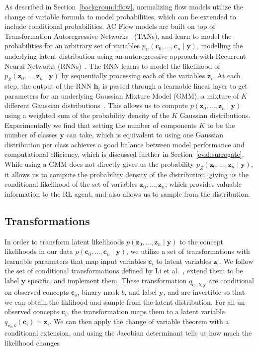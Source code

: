 As described in Section~\ref{background:flow}, 
normalizing flow models utilize the change of variable formula to model probabilities,
which can be extended to include conditional probabilities. AC Flow models are built on top of
Transformation Autoregressive
Networks~\cite{tans} (TANs), and learn to model 
the probabilities for an arbitrary set of variables $p_C(\mathbf{c}_0,\ldots, \mathbf{c}_n \mid \mathbf{y})$,
modelling the underlying latent distribution using an autoregressive approach with Recurrent
Neural Networks (RNNs)~\cite{rnn}. The RNN learns to model the likelihood of 
$p_Z(\mathbf{z}_0, \ldots, \mathbf{z}_n \mid \mathbf{y})$ by sequentially processing each of the variables $\mathbf{z}_i$.
At each step, the output of the RNN $\mathbf{h}_i$ is 
passed through a learnable linear layer to get parameters for an underlying Gaussian Mixture Model (GMM),
a mixture of $K$ different Gaussian distributions~\cite{gmm}.
This allows us to compute $p(\mathbf{z}_0, \ldots, \mathbf{z}_n \mid \mathbf{y})$ 
using a weighted
sum of the probability density of the $K$ Gaussian distributions. Experimentally
we find that setting the number of components $K$ to be the number of classes 
$\mathbf{y}$ can take, which is equivalent to using one Gaussian distribution per 
class 
achieves
a good balance between model performance and computational efficiency,
which is discussed further in Section~\ref{eval:surrogate}.
While using a GMM does not directly gives us the probability
$p_Z(\mathbf{z}_0, \ldots, \mathbf{z}_n \mid \mathbf{y})$, it allows us to compute the probability density of the distribution, giving 
us the conditional likelihood of the set of variables $\mathbf{z}_0, \ldots, \mathbf{z}_n$, which provides valuable information
to the RL agent, and also allows us to sample from the distribution.

\subsection{Transformations}
In order to transform latent likelihoods $p(\mathbf{z}_0, \ldots, \mathbf{z}_n \mid \mathbf{y})$ to 
the concept likelihoods in our data
$p(\mathbf{c}_0,\ldots, \mathbf{c}_n \mid \mathbf{y})$, we
utilize a set of transformations with learnable parameters that 
map input variables $\mathbf{c}_i$ to latent variables $\mathbf{z}_i$. We follow the 
set of conditional transformations defined by Li et al.~\cite{acflow}, extend them to
be label $\mathbf{y}$ specific, and implement them.
These transformation $q_{\mathbf{c}_o, b, \mathbf{y}}$ are
conditional on 
observed concepts $\mathbf{c}_o$, binary mask $b$, and label $\mathbf{y}$, 
and are invertible so that we can obtain the liklihood and 
sample from the latent distribution. 
For all un-observed concepts $\mathbf{c}_i$,
the transformation maps them to a latent variable $q_{\mathbf{c}_o, b}(\mathbf{c}_i) = \mathbf{z}_i$. 
We can then apply the change
of variable theorem with a conditional extension, and using
the Jacobian determinant tells us how much the likelihood changes~\cite{normalizing-flows}

